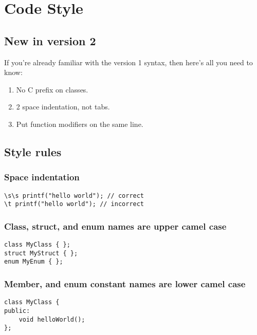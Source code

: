 \section{Code Style}

\subsection{New in version 2}

If you're already familiar with the version 1 syntax, then here's all you need
to know:

\begin{enumerate}
  \item No C prefix on classes.
  \item 2 space indentation, not tabs.
  \item Put function modifiers on the same line.
\end{enumerate}

\subsection{Style rules}

\subsubsection{Space indentation}

\begin{verbatim}
\s\s printf("hello world"); // correct
\t printf("hello world"); // incorrect
\end{verbatim}

\subsubsection{Class, struct, and enum names are upper camel case}

\begin{verbatim}
class MyClass { };
struct MyStruct { };
enum MyEnum { };
\end{verbatim}

\subsubsection{Member, and enum constant names are lower camel case}

\begin{verbatim}
class MyClass {
public:
    void helloWorld();
};
\end{verbatim}

